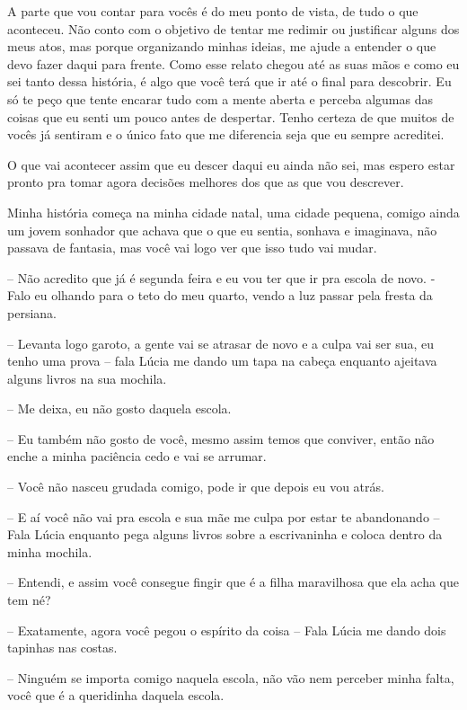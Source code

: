 A parte que vou contar para vocês é do meu ponto de vista, de tudo o que aconteceu. Não conto com o objetivo de tentar me redimir ou justificar alguns dos meus atos, mas porque organizando minhas ideias, me ajude a entender o que devo fazer daqui para frente. Como esse relato chegou até as suas mãos e como eu sei tanto dessa história, é algo que você terá que ir até o final para descobrir. Eu só te peço que tente encarar tudo com a mente aberta e perceba algumas das coisas que eu senti um pouco antes de despertar. Tenho certeza de que muitos de vocês já sentiram e o único fato que me diferencia seja que eu sempre acreditei.

O que vai acontecer assim que eu descer daqui eu ainda não sei, mas espero estar pronto pra tomar agora decisões melhores dos que as que vou descrever.

Minha história começa na minha cidade natal, uma cidade pequena, comigo ainda um jovem sonhador que achava que o que eu sentia, sonhava e imaginava, não passava de fantasia, mas você vai logo ver que isso tudo vai mudar.

-- Não acredito que já é segunda feira e eu vou ter que ir pra escola de novo. - Falo eu olhando para o teto do meu quarto, vendo a luz passar pela fresta da persiana.

-- Levanta logo garoto, a gente vai se atrasar de novo e a culpa vai ser sua, eu tenho uma prova -- fala Lúcia me dando um tapa na cabeça enquanto ajeitava alguns livros na sua mochila.

-- Me deixa, eu não gosto daquela escola.

-- Eu também não gosto de você, mesmo assim temos que conviver, então não enche a minha paciência cedo e vai se arrumar.

-- Você não nasceu grudada comigo, pode ir que depois eu vou atrás.

-- E aí você não vai pra escola e sua mãe me culpa por estar te abandonando -- Fala Lúcia enquanto pega alguns livros sobre a escrivaninha e coloca dentro da minha mochila.

-- Entendi, e assim você consegue fingir que é a filha maravilhosa que ela acha que tem né?

-- Exatamente, agora você pegou o espírito da coisa -- Fala Lúcia me dando dois tapinhas nas costas.

-- Ninguém se importa comigo naquela escola, não vão nem perceber minha falta, você que é a queridinha daquela escola.

